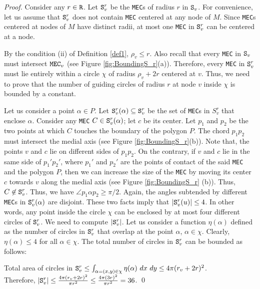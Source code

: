 \documentclass[12pt]{llncs}
\begin{document}
\begin{proof}
Consider any $r \in {\tt R}$. Let ${\tt S}_v^r$ be the {\tt MEC}s of radius $r$ in 
${\tt S}_v$. 
For convenience, let us assume that ${\tt S}_v^r$ does not contain {\tt MEC}  
centered at any node of $M$. Since {\tt MEC}s centered at nodes of $M$ have 
distinct radii, at most one {\tt MEC}  in ${\tt S}_v^r$ can be centered at a node.

By the condition (ii) of Definition \ref{def1}, $\rho_v \le r$. Also recall that every 
{\tt MEC} in ${\tt S}_v$ must intersect ${\tt MEC}_v$ (see 
Figure \ref{fig:BoundingS_r}(a)). Therefore, every {\tt MEC}  in ${\tt S}_v^r$ must lie 
entirely within a circle $\chi$ of radius $\rho_v + 2r$ centered at $v$. Thus, we need 
to prove that the number of guiding circles of radius $r$ at node $v$ inside $\chi$ is
bounded by a constant.

Let us consider a point $\alpha \in P$. Let ${\tt S}_v^r(\alpha) \subseteq {\tt S}_v^r$ 
be the set of {\tt MEC}s in $S_v^r$ that enclose $\alpha$. Consider any {\tt MEC}  $C 
\in 
{\tt S}_v^r(\alpha)$; let $c$ be its center. Let $p_1$ and $p_2$ be the two points at 
which $C$ touches the boundary of the polygon $P$. The chord $p_1p_2$ must 
intersect 
the medial axis (see Figure \ref{fig:BoundingS_r}(b)). Note that, the points $v$ and $c
$ 
lie on different sides of $p_1p_2$. On the contrary, if $v$ and $c$ lie in 
the same side of $p_1'p_2'$, where $p_1'$ and $p_2'$ are the points of contact of the 
said {\tt MEC}  and the polygon $P$, then we can increase the size of the {\tt MEC} by 
moving its center $c$ towards $v$ along the medial axis (see Figure 
\ref{fig:BoundingS_r}
(b)). 
Thus, $C \not\in {\tt S}_v^r$. Thus, we have $\angle p_1 \alpha p_2 \ge \pi/2$. Again, 
the 
angles subtended by different {\tt MEC}s in ${\tt S}_v^r(\alpha)$ are disjoint. These 
two 
facts imply that $|{\tt S}_v^r(u)| \le 4$. In other words, any point inside the circle 
$\chi$ can be enclosed by at most four different circles of ${\tt S}_v^r$. We need to 
compute $|{\tt S}_v^r|$. Let us consider a function $\eta(\alpha)$ defined as the 
number 
of circles in ${\tt S}_v^r$ that overlap at the point $\alpha$, $\alpha \in \chi$. Clearly, 
$\eta(\alpha) \leq 4$ for all $\alpha \in \chi$. The total number of circles in 
${\tt S}_v^r$ can be bounded as follows: 

Total area of circles in ${\tt S}_v^r \leq   \int_{\alpha=(x,y) \in \chi} \eta(\alpha) ~dx
~dy \le 4 \pi(r_v + 2r)^2$. \\ 

Therefore, $|{\tt S}_v^r|  \leq  \frac{4 \pi(r_v + 2r)^2}{ \pi r^2} \leq
\frac{4 \pi (3r)^2}{ \pi r^2} = 36$. \qed
\end{proof}
\end{document}
